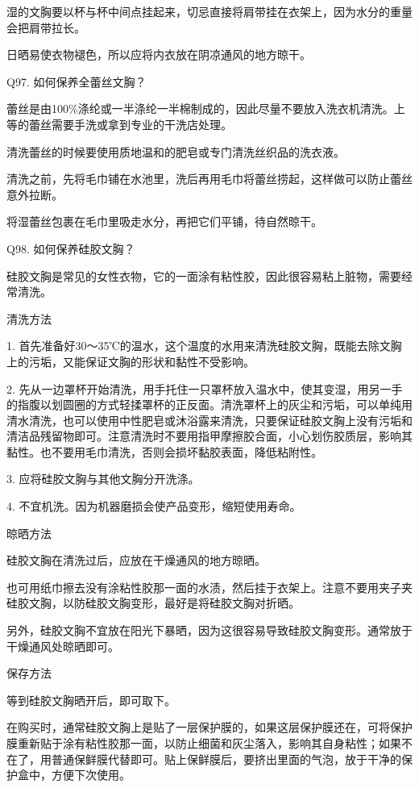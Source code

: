 \documentclass[12pt,UTF8]{ctexbook}
\begin{document}
湿的文胸要以杯与杯中间点挂起来，切忌直接将肩带挂在衣架上，因为水分的重量会把肩带拉长。

日晒易使衣物褪色，所以应将内衣放在阴凉通风的地方晾干。





Q97. 如何保养全蕾丝文胸？


蕾丝是由100\%涤纶或一半涤纶一半棉制成的，因此尽量不要放入洗衣机清洗。上等的蕾丝需要手洗或拿到专业的干洗店处理。

清洗蕾丝的时候要使用质地温和的肥皂或专门清洗丝织品的洗衣液。

清洗之前，先将毛巾铺在水池里，洗后再用毛巾将蕾丝捞起，这样做可以防止蕾丝意外拉断。

将湿蕾丝包裹在毛巾里吸走水分，再把它们平铺，待自然晾干。





Q98. 如何保养硅胶文胸？


硅胶文胸是常见的女性衣物，它的一面涂有粘性胶，因此很容易粘上脏物，需要经常清洗。

清洗方法

1. 首先准备好30～35℃的温水，这个温度的水用来清洗硅胶文胸，既能去除文胸上的污垢，又能保证文胸的形状和黏性不受影响。

2. 先从一边罩杯开始清洗，用手托住一只罩杯放入温水中，使其变湿，用另一手的指腹以划圆圈的方式轻揉罩杯的正反面。清洗罩杯上的灰尘和污垢，可以单纯用清水清洗，也可以使用中性肥皂或沐浴露来清洗，只要保证硅胶文胸上没有污垢和清洁品残留物即可。注意清洗时不要用指甲摩擦胶合面，小心划伤胶质层，影响其黏性。也不要用毛巾清洗，否则会损坏黏胶表面，降低粘附性。

3. 应将硅胶文胸与其他文胸分开洗涤。

4. 不宜机洗。因为机器磨损会使产品变形，缩短使用寿命。

晾晒方法

硅胶文胸在清洗过后，应放在干燥通风的地方晾晒。

也可用纸巾擦去没有涂粘性胶那一面的水渍，然后挂于衣架上。注意不要用夹子夹硅胶文胸，以防硅胶文胸变形，最好是将硅胶文胸对折晒。

另外，硅胶文胸不宜放在阳光下暴晒，因为这很容易导致硅胶文胸变形。通常放于干燥通风处晾晒即可。

保存方法

等到硅胶文胸晒开后，即可取下。

在购买时，通常硅胶文胸上是贴了一层保护膜的，如果这层保护膜还在，可将保护膜重新贴于涂有粘性胶那一面，以防止细菌和灰尘落入，影响其自身粘性；如果不在了，用普通保鲜膜代替即可。贴上保鲜膜后，要挤出里面的气泡，放于干净的保护盒中，方便下次使用。
\end{document}
